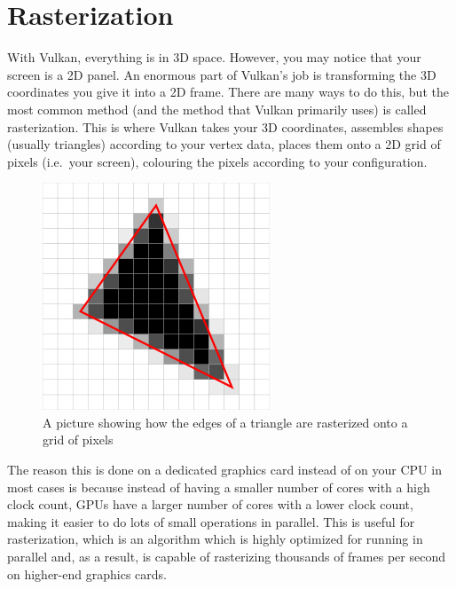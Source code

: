 \newpage
\section{\textsf{Rasterization}}\label{rasterization}

With Vulkan, everything is in 3D space. However, you may notice that your screen is a 2D panel. An enormous part of Vulkan's job is transforming the 3D coordinates you give it into a 2D frame. There are many ways to do this, but the most common method (and the method that Vulkan primarily uses) is called rasterization. This is where Vulkan takes your 3D coordinates, assembles shapes (usually triangles) according to your vertex data, places them onto a 2D grid of pixels (i.e.~your screen), colouring the pixels according to your
configuration.

\begin{figure}[ht]
    \centering
    \includegraphics{images/chap1/rasterization.png}
    \caption{A picture showing how the edges of a triangle are rasterized
    onto a grid of pixels}
\end{figure}

The reason this is done on a dedicated graphics card instead of on your CPU in most cases is because instead of having a smaller number of cores with a high clock count, GPUs have a larger number of cores with a lower clock count, making it easier to do lots of small operations in parallel. This is useful for rasterization, which is an algorithm which is highly optimized for running in parallel and, as a result, is capable of rasterizing thousands of frames per second on higher-end graphics cards.